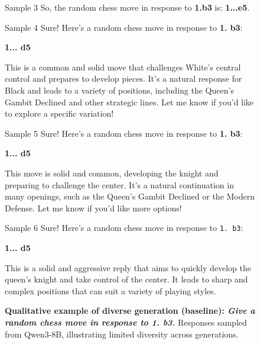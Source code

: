 \begin{figure}[t]
\begin{minipage}[t]{0.32\linewidth}
\begin{respbox}{Sample 3}
So, the random chess move in response to \textbf{1.b3} is: \textbf{1...e5}.
\end{respbox}
\end{minipage}

\vspace{6pt}

\begin{minipage}[t]{0.32\linewidth}
\begin{respbox}{Sample 4}
Sure! Here's a random chess move in response to \textbf{1. b3}:

\textbf{1... d5}

This is a common and solid move that challenges White's central control and prepares to develop pieces. It's a natural response for Black and leads to a variety of positions, including the Queen's Gambit Declined and other strategic lines. Let me know if you'd like to explore a specific variation!
\end{respbox}
\end{minipage}\hfill%
\begin{minipage}[t]{0.32\linewidth}
\begin{respbox}{Sample 5}
Sure! Here's a random chess move in response to \textbf{1. b3}:

\textbf{1... d5}

This move is solid and common, developing the knight and preparing to challenge the center. It's a natural continuation in many openings, such as the Queen's Gambit Declined or the Modern Defense. Let me know if you'd like more options!
\end{respbox}
\end{minipage}\hfill%
\begin{minipage}[t]{0.32\linewidth}
\begin{respbox}{Sample 6}
Sure! Here's a random chess move in response to \texttt{1. b3}:

\textbf{1... d5}

This is a solid and aggressive reply that aims to quickly develop the queen's knight and take control of the center. It leads to sharp and complex positions that can suit a variety of playing styles.
\end{respbox}
\end{minipage}

\vspace{6pt}
\caption{\textbf{Qualitative example of diverse generation (baseline): \textit{Give a random chess move in response to 1. b3.}} Responses sampled from Qwen3-8B, illustrating limited diversity across generations.}
\label{fig:qualitative-example-chess-baseline}
\end{figure}

